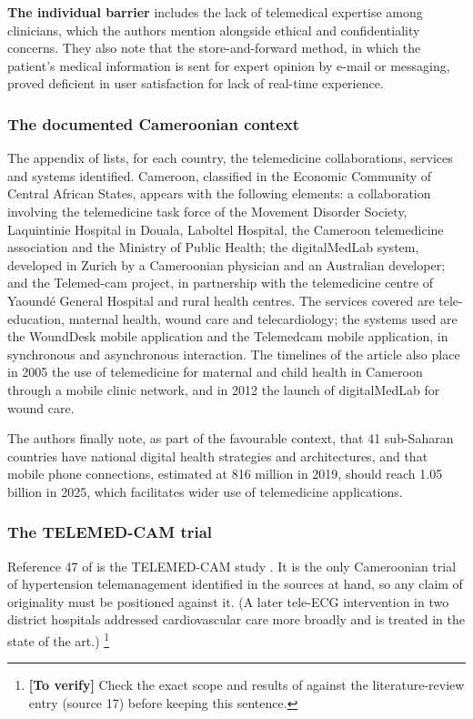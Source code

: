 \documentclass[12pt,a4paper,oneside]{report}
\newcommand{\verify}[1]{\footnote{\textbf{[To verify]} #1}}
\begin{document}
\textbf{The individual barrier} includes the lack of telemedical expertise among clinicians, which the authors mention alongside ethical and confidentiality concerns. They also note that the store-and-forward method, in which the patient's medical information is sent for expert opinion by e-mail or messaging, proved deficient in user satisfaction for lack of real-time experience.

\subsubsection{The documented Cameroonian context}

The appendix of \textcite{dodoo2022} lists, for each country, the telemedicine collaborations, services and systems identified. Cameroon, classified in the Economic Community of Central African States, appears with the following elements: a collaboration involving the telemedicine task force of the Movement Disorder Society, Laquintinie Hospital in Douala, Laboltel Hospital, the Cameroon telemedicine association and the Ministry of Public Health; the digitalMedLab system, developed in Zurich by a Cameroonian physician and an Australian developer; and the Telemed-cam project, in partnership with the telemedicine centre of Yaoundé General Hospital and rural health centres. The services covered are tele-education, maternal health, wound care and telecardiology; the systems used are the WoundDesk mobile application and the Telemedcam mobile application, in synchronous and asynchronous interaction. The timelines of the article also place in 2005 the use of telemedicine for maternal and child health in Cameroon through a mobile clinic network, and in 2012 the launch of digitalMedLab for wound care.

The authors finally note, as part of the favourable context, that 41 sub-Saharan countries have national digital health strategies and architectures, and that mobile phone connections, estimated at 816 million in 2019, should reach 1.05 billion in 2025, which facilitates wider use of telemedicine applications.

\subsubsection{The TELEMED-CAM trial}\label{sec:telemedcam}

Reference 47 of \textcite{dodoo2022} is the TELEMED-CAM study \parencite{kingue2013}. It is the only Cameroonian trial of hypertension telemanagement identified in the sources at hand, so any claim of originality must be positioned against it. (A later tele-ECG intervention in two district hospitals \parencite{bediang2021} addressed cardiovascular care more broadly and is treated in the state of the art.)%
\verify{Check the exact scope and results of \textcite{bediang2021} against the literature-review entry (source 17) before keeping this sentence.}
\end{document}
